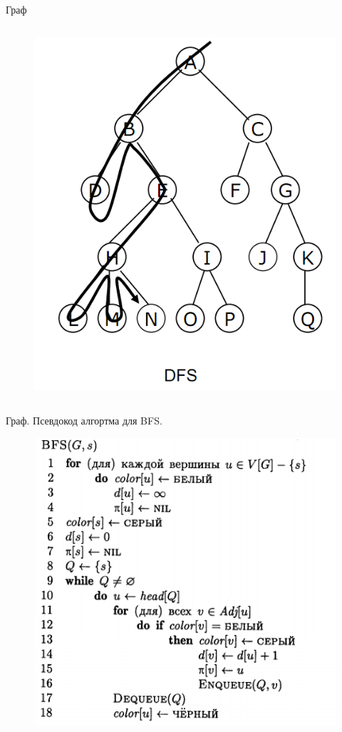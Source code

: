 \documentclass[10pt]{beamer}
\begin{document}
\begin{frame}{Граф}
\begin{columns}
\begin{column}{.4\linewidth}
\begin{figure}
		\centerline{\includegraphics[width=1.0\linewidth]{images/dfs.png}}
		\end{figure}
	\end{column}
\end{columns}
\end{frame}


\begin{frame}{Граф. Псевдокод алгортма для BFS.}
\begin{figure}
\centerline{\includegraphics[width=0.7\linewidth]{images/bfs_algo.png}}
\end{figure}
\end{frame}
\end{document}
